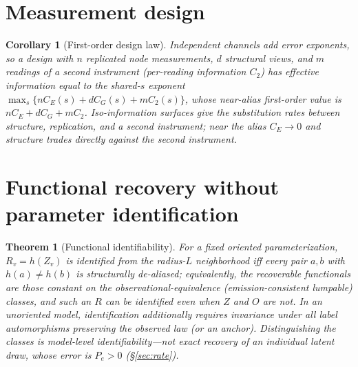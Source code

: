 \documentclass[11pt]{article}
\theoremstyle{plain}
\newtheorem{theorem}{Theorem}\newtheorem{proposition}{Proposition}\newtheorem{corollary}{Corollary}
\theoremstyle{definition}\newtheorem{definition}{Definition}\newtheorem{assumption}{Assumption}
\begin{document}
\section{Measurement design}\label{sec:design}
\begin{corollary}[First-order design law]\label{cor:design}
Independent channels add error exponents, so a design with $n$ replicated node measurements, $d$ structural views,
and $m$ readings of a second instrument (per-reading information $C_2$) has effective information equal to the
shared-$s$ exponent $\max_s\{nC_E(s)+dC_G(s)+mC_2(s)\}$, whose near-alias first-order value is
$nC_E+dC_G+mC_2$. Iso-information surfaces give the substitution rates between structure, replication, and a
second instrument; near the alias $C_E\to0$ and structure trades directly against the second instrument.
\end{corollary}

\section{Functional recovery without parameter identification}\label{sec:func}
\begin{theorem}[Functional identifiability]\label{thm:func}
For a fixed oriented parameterization, $R_v=h(Z_v)$ is identified from the radius-$L$ neighborhood iff every pair
$a,b$ with $h(a)\neq h(b)$ is structurally de-aliased; equivalently, the recoverable functionals are those constant
on the observational-equivalence (emission-consistent lumpable) classes, and such an $R$ can be identified even
when $Z$ and $O$ are not. In an \emph{unoriented} model, identification additionally requires invariance under all
label automorphisms preserving the observed law (or an anchor). Distinguishing the classes is model-level
identifiability---not exact recovery of an individual latent draw, whose error is $P_e>0$ (\S\ref{sec:rate}).
\end{theorem}
\end{document}
